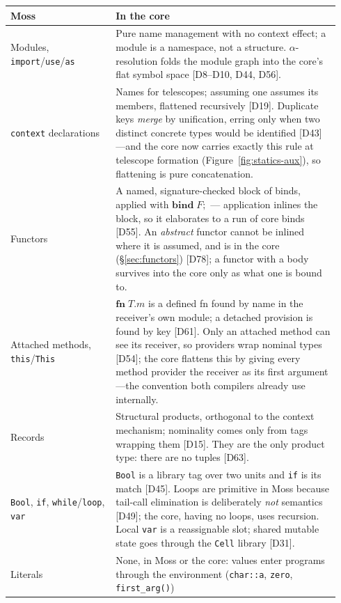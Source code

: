 \documentclass[10pt]{article}
\newcommand{\kw}[1]{\mathbf{#1}}          %
\theoremstyle{plain}
\theoremstyle{remark}
\begin{document}
\begin{table}[h]
\centering\small
\begin{tabular}{@{}p{0.30\linewidth}p{0.64\linewidth}@{}}
\toprule
\textbf{Moss} & \textbf{In the core} \\
\midrule
Modules, \texttt{import}/\texttt{use}/\texttt{as} &
Pure name management with no context effect; a module is a namespace,
not a structure. $\alpha$-resolution folds the module graph into the
core's flat symbol space [D8--D10, D44, D56]. \\[3pt]
\texttt{context} declarations &
Names for telescopes; assuming one assumes its members, flattened
recursively [D19]. Duplicate keys \emph{merge} by unification, erring only
when two distinct concrete types would be identified [D43]---and the core
now carries exactly this rule at telescope formation
(Figure~\ref{fig:statics-aux}), so flattening is pure concatenation. \\[3pt]
Functors &
A named, signature-checked block of binds, applied with
$\kw{bind}\;F;$ --- application inlines the block, so it elaborates to a
run of core binds [D55]. An \emph{abstract} functor cannot be inlined
where it is assumed, and is in the core (\S\ref{sec:functors}) [D78]; a
functor with a body survives into the core only as what one is bound
to. \\[3pt]
Attached methods, \texttt{this}/\texttt{This} &
$\kw{fn}\;T.m$ is a defined fn found by name in the receiver's own
module; a detached provision is found by key [D61]. Only an attached
method can see its receiver, so providers wrap nominal types [D54]; the
core flattens this by giving every method provider the receiver as its
first argument---the convention both compilers already use internally. \\[3pt]
Records &
Structural products, orthogonal to the context mechanism; nominality
comes only from tags wrapping them [D15]. They are the only product
type: there are no tuples [D63]. \\[3pt]
\texttt{Bool}, \texttt{if}, \texttt{while}/\texttt{loop}, \texttt{var} &
\texttt{Bool} is a library tag over two units and \texttt{if} is its
match [D45]. Loops are primitive in Moss because tail-call elimination
is deliberately \emph{not} semantics [D49]; the core, having no loops,
uses recursion. Local \texttt{var} is a reassignable slot; shared
mutable state goes through the \texttt{Cell} library [D31]. \\[3pt]
Literals &
None, in Moss or the core: values enter programs through the
environment (\texttt{char::a}, \texttt{zero}, \texttt{first\_arg()})

\end{tabular}
\end{table}
\end{document}
